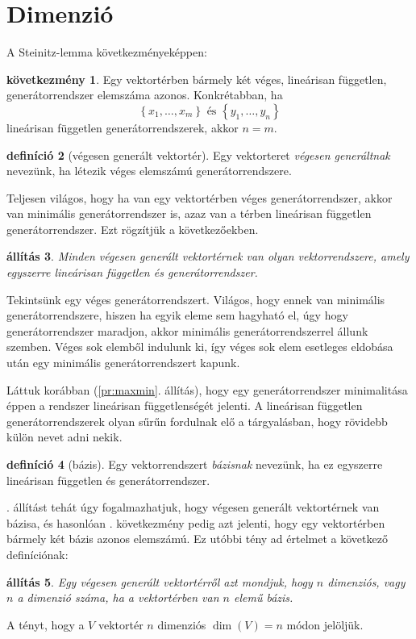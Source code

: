 \documentclass[a4paper, showtrims]{memoir}
\makeatletter
\renewenvironment{proof}[1][\proofname]
    {\par\pushQED{\qed}%
    \normalfont \topsep6\p@\@plus6\p@\relax
    \trivlist
    \item[\hskip\labelsep
        \itshape
    #1\@addpunct{:}]\ignorespaces}
    {\popQED\endtrivlist\@endpefalse}
\theoremstyle{plain}
\newtheorem{proposition}{állítás}[chapter]
\theoremstyle{remark}
\theoremstyle{definition}
\newtheorem{definition}[proposition]{definíció}
\newtheorem{corollary}[proposition]{következmény}
\makeatother
\begin{document}
\section{Dimenzió}
A Steinitz-lemma következményeképpen:
\begin{corollary}
	Egy vektortérben bármely két véges, lineárisan független, generátorrendszer elemszáma azonos.
	Konkrétabban, ha
	\[
		\left\{ x_1,\ldots,x_m \right\} \text{ és } \left\{ y_1,\ldots,y_n \right\}
	\]
	lineárisan független generátorrendszerek, akkor $n=m$.
	\label{co:baziselemszam}
\end{corollary}
\begin{definition}[végesen generált vektortér]
	Egy vektorteret \emph{végesen generáltnak} nevezünk,
	ha létezik véges elemszámú generátorrendszere.
\end{definition}
Teljesen világos, hogy ha van egy vektortérben véges generátorrendszer,
akkor van minimális generátorrendszer is, azaz van a térben lineárisan független generátorrendszer.
Ezt rögzítjük a következőekben.
\begin{proposition}
	Minden végesen generált vektortérnek van olyan vektorrendszere,
	amely egyszerre lineárisan független és generátorrendszer.
	\label{pr:bazisletezik}
\end{proposition}
\begin{proof}
	Tekintsünk egy véges generátorrendszert.
    Világos, hogy ennek van minimális generátorrendszere,
    hiszen ha egyik eleme sem hagyható el, úgy hogy generátorrendszer maradjon, akkor minimális
    generátorrendszerrel állunk szemben. 
    Véges sok elemből indulunk ki, 
    így véges sok elem esetleges eldobása után egy minimális generátorrendszert kapunk.

    Láttuk korábban (\ref{pr:maxmin}. állítás), hogy egy generátorrendszer minimalitása éppen a rendszer lineárisan függetlenségét jelenti.
\end{proof}
A lineárisan független generátorrendszerek olyan sűrűn fordulnak elő a tárgyalásban,
hogy rövidebb külön nevet adni nekik.
\begin{definition}[bázis]
	Egy vektorrendszert \emph{bázisnak} nevezünk, ha ez egyszerre lineárisan független és generátorrendszer.
\end{definition}
. állítást tehát úgy fogalmazhatjuk, hogy végesen generált vektortérnek van bázisa,
és hasonlóan . következmény pedig azt jelenti,
hogy egy vektortérben bármely két bázis azonos elemszámú.
Ez utóbbi tény ad értelmet a következő definíciónak:
\begin{proposition}
	Egy végesen generált vektortérről azt mondjuk, hogy $n$ dimenziós, vagy $n$ a dimenzió száma,
	ha a vektortérben van $n$ elemű bázis.
\end{proposition}
A tényt, hogy a $V$ vektortér $n$ dimenziós $\dim\left( V \right)=n$ módon jelöljük.
\end{document}

